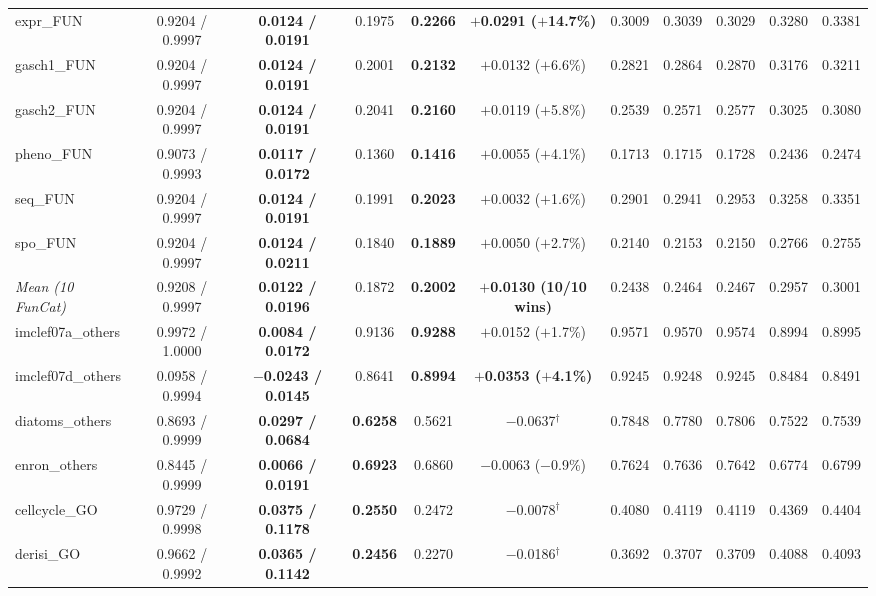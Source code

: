 \documentclass[preprint,12pt]{elsarticle}
\begin{document}
\begin{table}[htbp]
{\begin{tabular}{lcccccccccc}
expr\_FUN        & 0.9204 / 0.9997 & \textbf{0.0124 / 0.0191} & 0.1975 & \textbf{0.2266} & \textbf{$+$0.0291 ($+$14.7\%)} & 0.3009 & 0.3039 & 0.3029 & 0.3280 & 0.3381 \\
gasch1\_FUN      & 0.9204 / 0.9997 & \textbf{0.0124 / 0.0191} & 0.2001 & \textbf{0.2132} & $+$0.0132 ($+$6.6\%) & 0.2821 & 0.2864 & 0.2870 & 0.3176 & 0.3211 \\
gasch2\_FUN      & 0.9204 / 0.9997 & \textbf{0.0124 / 0.0191} & 0.2041 & \textbf{0.2160} & $+$0.0119 ($+$5.8\%) & 0.2539 & 0.2571 & 0.2577 & 0.3025 & 0.3080 \\
pheno\_FUN       & 0.9073 / 0.9993 & \textbf{0.0117 / 0.0172} & 0.1360 & \textbf{0.1416} & $+$0.0055 ($+$4.1\%) & 0.1713 & 0.1715 & 0.1728 & 0.2436 & 0.2474 \\
seq\_FUN         & 0.9204 / 0.9997 & \textbf{0.0124 / 0.0191} & 0.1991 & \textbf{0.2023} & $+$0.0032 ($+$1.6\%) & 0.2901 & 0.2941 & 0.2953 & 0.3258 & 0.3351 \\
spo\_FUN         & 0.9204 / 0.9997 & \textbf{0.0124 / 0.0211} & 0.1840 & \textbf{0.1889} & $+$0.0050 ($+$2.7\%) & 0.2140 & 0.2153 & 0.2150 & 0.2766 & 0.2755 \\
\midrule
\textit{Mean (10 FunCat)} & 0.9208 / 0.9997 & \textbf{0.0122 / 0.0196} & 0.1872 & \textbf{0.2002} & \textbf{$+$0.0130 (10/10 wins)} & 0.2438 & 0.2464 & 0.2467 & 0.2957 & 0.3001 \\
\midrule
imclef07a\_others & 0.9972 / 1.0000 & \textbf{0.0084 / 0.0172} & 0.9136 & \textbf{0.9288} & $+$0.0152 ($+$1.7\%) & 0.9571 & 0.9570 & 0.9574 & 0.8994 & 0.8995 \\
imclef07d\_others & 0.0958 / 0.9994 & \textbf{$-$0.0243 / 0.0145} & 0.8641 & \textbf{0.8994} & \textbf{$+$0.0353 ($+$4.1\%)} & 0.9245 & 0.9248 & 0.9245 & 0.8484 & 0.8491 \\
diatoms\_others   & 0.8693 / 0.9999 & \textbf{0.0297 / 0.0684} & \textbf{0.6258} & 0.5621 & $-$0.0637$^\dagger$ & 0.7848 & 0.7780 & 0.7806 & 0.7522 & 0.7539 \\
enron\_others     & 0.8445 / 0.9999 & \textbf{0.0066 / 0.0191} & \textbf{0.6923} & 0.6860 & $-$0.0063 ($-$0.9\%) & 0.7624 & 0.7636 & 0.7642 & 0.6774 & 0.6799 \\
\midrule
cellcycle\_GO     & 0.9729 / 0.9998 & \textbf{0.0375 / 0.1178} & \textbf{0.2550} & 0.2472 & $-$0.0078$^\dagger$ & 0.4080 & 0.4119 & 0.4119 & 0.4369 & 0.4404 \\
derisi\_GO        & 0.9662 / 0.9992 & \textbf{0.0365 / 0.1142} & \textbf{0.2456} & 0.2270 & $-$0.0186$^\dagger$ & 0.3692 & 0.3707 & 0.3709 & 0.4088 & 0.4093 \\

\end{tabular}}
\end{table}
\end{document}
